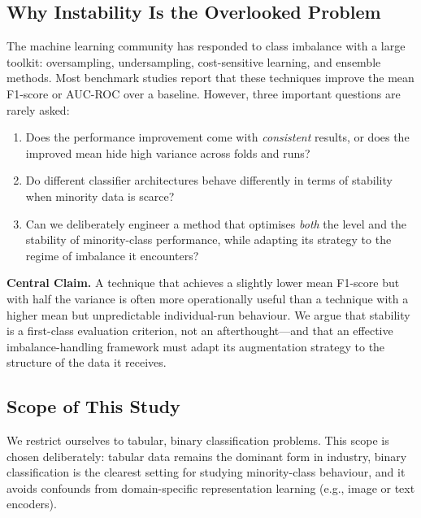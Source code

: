 \documentclass[11pt,a4paper]{article}
\begin{document}
\subsection{Why Instability Is the Overlooked Problem}

The machine learning community has responded to class imbalance with a large toolkit:
oversampling, undersampling, cost-sensitive learning, and ensemble methods. Most benchmark
studies report that these techniques improve the mean F1-score or AUC-ROC over a baseline.
However, three important questions are rarely asked:

\begin{enumerate}
  \item Does the performance improvement come with \emph{consistent} results, or does the
        improved mean hide high variance across folds and runs?
  \item Do different classifier architectures behave differently in terms of stability when
        minority data is scarce?
  \item Can we deliberately engineer a method that optimises \emph{both} the level and the
        stability of minority-class performance, while adapting its strategy to the regime of
        imbalance it encounters?
\end{enumerate}

\begin{claimbox}
\textbf{Central Claim.} A technique that achieves a slightly lower mean F1-score but with
half the variance is often more operationally useful than a technique with a higher mean but
unpredictable individual-run behaviour. We argue that stability is a first-class evaluation
criterion, not an afterthought---and that an effective imbalance-handling framework must
adapt its augmentation strategy to the structure of the data it receives.
\end{claimbox}

\subsection{Scope of This Study}

We restrict ourselves to tabular, binary classification problems. This scope is chosen
deliberately: tabular data remains the dominant form in industry, binary classification is the
clearest setting for studying minority-class behaviour, and it avoids confounds from
domain-specific representation learning (e.g., image or text encoders).

\end{document}
